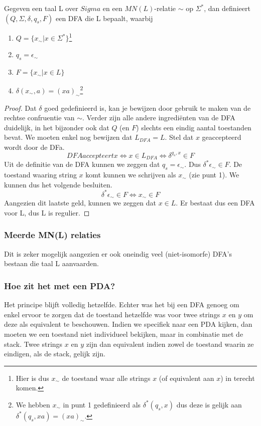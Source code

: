 \begin{theorem}
  Gegeven een taal L over $Sigma$ en een $MN(L)$-relatie $\sim$ op $\Sigma^*$, dan definieert $(Q,\Sigma,\delta,q_s,F)$ een DFA die L bepaalt, waarbij
  \begin{enumerate}
    \item $Q = \{x_{\sim}|x \in \Sigma^*\}$\footnote{Hier is dus $x_{\sim}$ de toestand waar alle strings $x$ (of equivalent aan $x$) in terecht komen.}
    \item $q_s = \epsilon_{\sim}$
    \item $F = \{x_{\sim}|x \in L\}$
    \item $\delta(x_{\sim},a) = (xa)_{\sim}$\footnote{We hebben $x_{\sim}$ in punt 1 gedefinieerd als $\delta^*(q_s,x)$ dus deze is gelijk aan $\delta^*(q_s,xa) = (xa)_{\sim}$.}
  \end{enumerate}
\end{theorem}

\begin{proof}
  Dat $\delta$ goed gedefinieerd is, kan je bewijzen door gebruik te maken van de rechtse confruentie van $\sim$. Verder zijn alle andere ingredi\"enten van de DFA duidelijk, in het bijzonder ook dat $Q$ (en $F$) slechts een eindig aantal toestanden bevat. We moeten enkel nog bewijzen dat $L_{DFA} = L$. Stel dat $x$ geaccepteerd wordt door de DFa.
  $$DFA accepteert x \iff x \in L_{DFA} \iff \delta^{q_s, x} \in F$$
  Uit de definitie van de DFA kunnen we zeggen dat $q_s = \epsilon_{\sim}$. Dus $\delta^*{\epsilon_{\sim} \in F}$. De toestand waaring string $x$ komt kunnen we schrijven als $x_{\sim}$ (zie punt 1). We kunnen dus het volgende besluiten.
  $$\delta^*{\epsilon_{\sim}} \in F \iff x_{\sim} \in F$$
  Aangezien dit laatste geld, kunnen we zeggen dat $x \in L$. Er bestaat dus een DFA voor L, dus L is regulier.
\end{proof}

\subsubsection*{Meerde MN(L) relaties}

Dit is zeker mogelijk aangezien er ook oneindig veel (niet-isomorfe) DFA's bestaan die taal L aanvaarden.

\subsubsection*{Hoe zit het met een PDA?}

Het principe blijft volledig hetzelfde. Echter was het bij een DFA genoeg om enkel ervoor te zorgen dat de toestand hetzelfde was voor twee strings $x$ en $y$ om deze als equivalent te beschouwen. Indien we specifiek naar een PDA kijken, dan moeten we een toestand niet individueel bekijken, maar in combinatie met de stack. Twee strings $x$ en $y$ zijn dan equivalent indien zowel de toestand waarin ze eindigen, als de stack, gelijk zijn.
